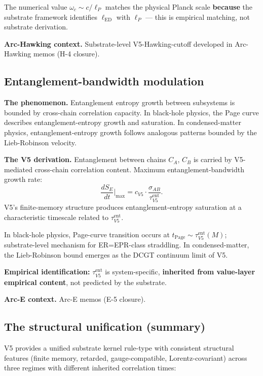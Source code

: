 \documentclass[11pt,a4paper]{article}
\begin{document}
The numerical value $\omega_c \sim c/\ell_P$ matches the physical Planck scale \textbf{because} the substrate framework identifies $\ell_\mathrm{ED}$ with $\ell_P$ --- this is empirical matching, not substrate derivation.

\textbf{Arc-Hawking context.} Substrate-level V5-Hawking-cutoff developed in Arc-Hawking memos (H-4 closure).

\subsection{Entanglement-bandwidth modulation}

\textbf{The phenomenon.} Entanglement entropy growth between subsystems is bounded by cross-chain correlation capacity. In black-hole physics, the Page curve describes entanglement-entropy growth and saturation. In condensed-matter physics, entanglement-entropy growth follows analogous patterns bounded by the Lieb-Robinson velocity.

\textbf{The V5 derivation.} Entanglement between chains $C_A$, $C_B$ is carried by V5-mediated cross-chain correlation content. Maximum entanglement-bandwidth growth rate:
\[
\frac{dS_E}{dt}\bigg|_\mathrm{max} = c_{V5} \cdot \frac{\sigma_{AB}}{\tau_{V5}^\mathrm{ent}}.
\]
V5's finite-memory structure produces entanglement-entropy saturation at a characteristic timescale related to $\tau_{V5}^\mathrm{ent}$.

In black-hole physics, Page-curve transition occurs at $t_\mathrm{Page} \sim \tau_{V5}^\mathrm{ent}(M)$; substrate-level mechanism for ER=EPR-class straddling. In condensed-matter, the Lieb-Robinson bound emerges as the DCGT continuum limit of V5.

\textbf{Empirical identification:} $\tau_{V5}^\mathrm{ent}$ is system-specific, \textbf{inherited from value-layer empirical content}, not predicted by the substrate.

\textbf{Arc-E context.} Arc-E memos (E-5 closure).

\subsection{The structural unification (summary)}

V5 provides a unified substrate kernel rule-type with consistent structural features (finite memory, retarded, gauge-compatible, Lorentz-covariant) across three regimes with different inherited correlation times:
\end{document}
